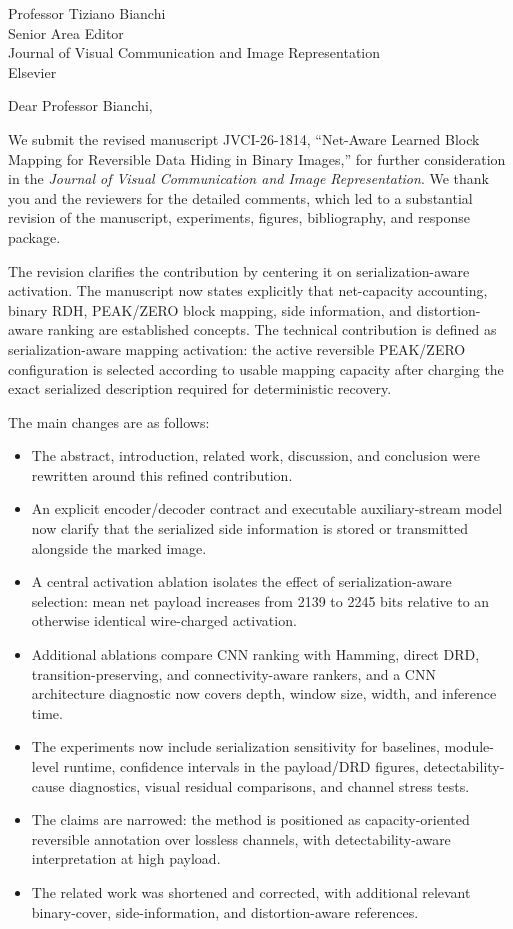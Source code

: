\documentclass[11pt,a4paper]{letter}
\begin{document}
\begin{letter}{Professor Tiziano Bianchi\\Senior Area Editor\\Journal of Visual Communication and Image Representation\\Elsevier}

\opening{Dear Professor Bianchi,}

We submit the revised manuscript JVCI-26-1814, ``Net-Aware Learned Block Mapping for Reversible Data Hiding in Binary Images,'' for further consideration in the \emph{Journal of Visual Communication and Image Representation}. We thank you and the reviewers for the detailed comments, which led to a substantial revision of the manuscript, experiments, figures, bibliography, and response package.

The revision clarifies the contribution by centering it on serialization-aware activation. The manuscript now states explicitly that net-capacity accounting, binary RDH, PEAK/ZERO block mapping, side information, and distortion-aware ranking are established concepts. The technical contribution is defined as serialization-aware mapping activation: the active reversible PEAK/ZERO configuration is selected according to usable mapping capacity after charging the exact serialized description required for deterministic recovery.

The main changes are as follows:
\begin{itemize}
  \item The abstract, introduction, related work, discussion, and conclusion were rewritten around this refined contribution.
  \item An explicit encoder/decoder contract and executable auxiliary-stream model now clarify that the serialized side information is stored or transmitted alongside the marked image.
  \item A central activation ablation isolates the effect of serialization-aware selection: mean net payload increases from 2139 to 2245 bits relative to an otherwise identical wire-charged activation.
  \item Additional ablations compare CNN ranking with Hamming, direct DRD, transition-preserving, and connectivity-aware rankers, and a CNN architecture diagnostic now covers depth, window size, width, and inference time.
  \item The experiments now include serialization sensitivity for baselines, module-level runtime, confidence intervals in the payload/DRD figures, detectability-cause diagnostics, visual residual comparisons, and channel stress tests.
  \item The claims are narrowed: the method is positioned as capacity-oriented reversible annotation over lossless channels, with detectability-aware interpretation at high payload.
  \item The related work was shortened and corrected, with additional relevant binary-cover, side-information, and distortion-aware references.
\end{itemize}


\end{letter}
\end{document}
